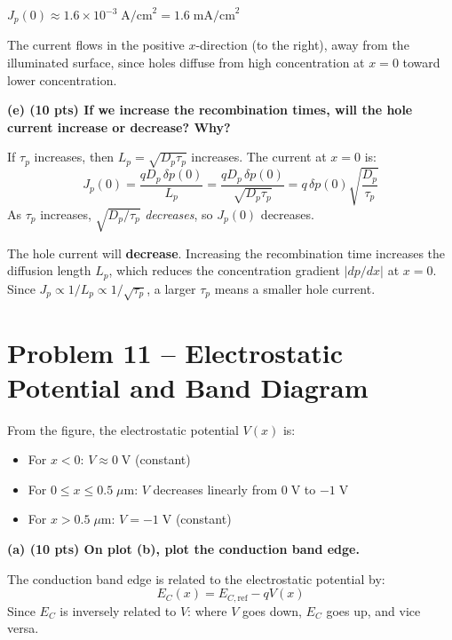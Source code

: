 \documentclass[11pt]{article}
\begin{document}
\begin{answerbox}
  $J_p(0) \approx 1.6 \times 10^{-3}\;\text{A/cm}^2 = 1.6\;\text{mA/cm}^2$

  The current flows in the positive $x$-direction (to the right), away from the illuminated surface, since holes diffuse from high concentration at $x=0$ toward lower concentration.
\end{answerbox}

\textbf{(e) (10 pts) If we increase the recombination times, will the hole current increase or decrease? Why?}

If $\tau_p$ increases, then $L_p = \sqrt{D_p \tau_p}$ increases. The current at $x = 0$ is:
\[
  J_p(0) = \frac{qD_p\,\delta p(0)}{L_p} = \frac{qD_p\,\delta p(0)}{\sqrt{D_p\tau_p}} = q\,\delta p(0)\sqrt{\frac{D_p}{\tau_p}}
\]
As $\tau_p$ increases, $\sqrt{D_p/\tau_p}$ \emph{decreases}, so $J_p(0)$ decreases.

\begin{answerbox}
  The hole current will \textbf{decrease}. Increasing the recombination time increases the diffusion length $L_p$, which reduces the concentration gradient $|dp/dx|$ at $x=0$. Since $J_p \propto 1/L_p \propto 1/\sqrt{\tau_p}$, a larger $\tau_p$ means a smaller hole current.
\end{answerbox}

\newpage

\section*{Problem 11 -- Electrostatic Potential and Band Diagram}

From the figure, the electrostatic potential $V(x)$ is:
\begin{itemize}[nosep]
  \item For $x < 0$: $V \approx 0\;\text{V}$ (constant)
  \item For $0 \le x \le 0.5\;\mu\text{m}$: $V$ decreases linearly from $0\;\text{V}$ to $-1\;\text{V}$
  \item For $x > 0.5\;\mu\text{m}$: $V = -1\;\text{V}$ (constant)
\end{itemize}

\textbf{(a) (10 pts) On plot (b), plot the conduction band edge.}

The conduction band edge is related to the electrostatic potential by:
\[
  E_C(x) = E_{C,\text{ref}} - qV(x)
\]
Since $E_C$ is inversely related to $V$: where $V$ goes down, $E_C$ goes up, and vice versa.
\end{document}
